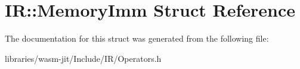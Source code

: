 \hypertarget{struct_i_r_1_1_memory_imm}{}\section{IR\+:\+:Memory\+Imm Struct Reference}
\label{struct_i_r_1_1_memory_imm}


The documentation for this struct was generated from the following file\+:\begin{DoxyCompactItemize}
\item 
libraries/wasm-\/jit/\+Include/\+I\+R/Operators.\+h\end{DoxyCompactItemize}
